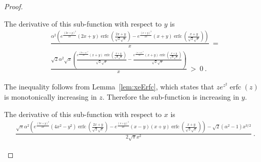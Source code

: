 \documentclass{article}
\DeclareMathOperator{\erfc}{erfc}
\begin{document}
\begin{proof}
\begin{itemize}
The derivative of this sub-function with respect to $y$ is
\begin{align}
&\frac{\alpha ^2 \left(e^{\frac{(2 x+y)^2}{2 x}} (2 x+y)
   \erfc \left(\frac{2 x+y}{\sqrt{2}
   \sqrt{x}}\right)-e^{\frac{(x+y)^2}{2 x}} (x+y)
   \erfc \left(\frac{x+y}{\sqrt{2} \sqrt{x}}\right)\right)}{x} \ =
  \\ \nonumber &\frac{\sqrt{2} \alpha ^2 \sqrt{x} \left(\frac{e^{\frac{(2 x+y)^2}{2 x}} (x+y) \erfc \left(\frac{x+y}{\sqrt{2} \sqrt{x}}\right)}{\sqrt{2} \sqrt{x}}-\frac{e^{\frac{(x+y)^2}{2 x}} (x+y) \erfc \left(\frac{x+y}{\sqrt{2} \sqrt{x}}\right)}{\sqrt{2} \sqrt{x}}\right)}{x}\ >\ 0 \ .
\end{align}

The inequality follows from Lemma~\ref{lem:xeErfc}, which states that 
$z e^{z^2} \erfc (z)$ is monotonically increasing in $z$.
Therefore the sub-function is increasing in $y$. 

The derivative of this sub-function with respect to $x$ is
\begin{align}
& \frac{\sqrt{\pi } \alpha ^2 \left(e^{\frac{(2 x+y)^2}{2 x}} \left(4 x^2-y^2\right) \erfc \left(\frac{2 x+y}{\sqrt{2} \sqrt{x}}\right) 
- e^{\frac{(x+y)^2}{2 x}} (x-y) (x+y) \erfc \left(\frac{x+y}{\sqrt{2} \sqrt{x}}\right)\right)-
\sqrt{2} \left(\alpha ^2-1\right) x^{3/2}}{2 \sqrt{\pi } x^2}\ . 
\end{align}


\end{itemize}
\end{proof}
\end{document}
